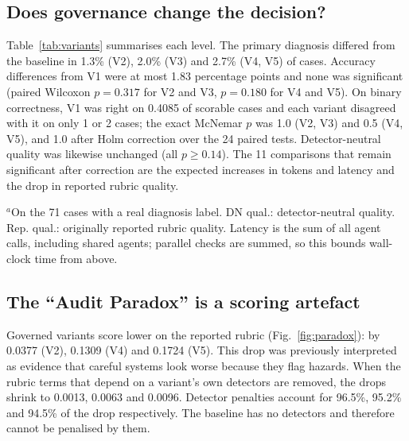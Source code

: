 \documentclass[conference]{IEEEtran}
\begin{document}
\subsection{Does governance change the decision?}
Table~\ref{tab:variants} summarises each level. The primary diagnosis differed from the baseline in 1.3\% (V2),
2.0\% (V3) and 2.7\% (V4, V5) of cases. Accuracy differences from V1 were at most 1.83 percentage points and none
was significant (paired Wilcoxon $p = 0.317$ for V2 and V3, $p = 0.180$ for V4 and V5). On binary correctness,
V1 was right on 0.4085 of scorable cases and each variant disagreed with it on only 1 or 2 cases; the exact McNemar
$p$ was 1.0 (V2, V3) and 0.5 (V4, V5), and 1.0 after Holm correction over the 24 paired tests. Detector-neutral
quality was likewise unchanged (all $p \ge 0.14$). The 11 comparisons that remain significant after correction are
the expected increases in tokens and latency and the drop in reported rubric quality.

\begin{table}[htbp]
\centering
\caption{Measured results by governance level (150 cases per variant)}
\label{tab:variants}
\vspace{1mm}

\footnotesize{$^a$On the 71 cases with a real diagnosis label. DN qual.: detector-neutral quality. Rep. qual.:
originally reported rubric quality. Latency is the sum of all agent calls, including shared agents; parallel checks are summed, so this bounds wall-clock time from above.}
\end{table}

\subsection{The ``Audit Paradox'' is a scoring artefact}
Governed variants score lower on the reported rubric (Fig.~\ref{fig:paradox}): by 0.0377 (V2), 0.1309 (V4) and
0.1724 (V5). This drop was previously interpreted as evidence that careful systems look worse because they flag
hazards. When the rubric terms that depend on a variant's own detectors are removed, the drops shrink to 0.0013,
0.0063 and 0.0096. Detector penalties account for 96.5\%, 95.2\% and 94.5\% of the drop respectively. The baseline
has no detectors and therefore cannot be penalised by them.
\end{document}
